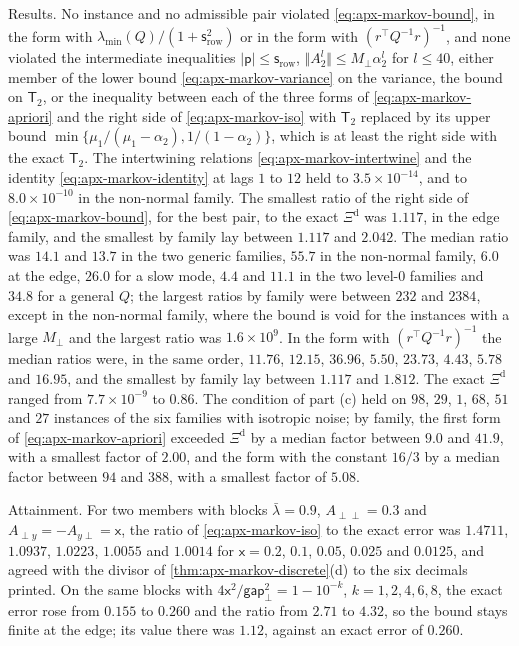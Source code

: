 \begin{numcheck}
Results. No instance and no admissible pair violated \eqref{eq:apx-markov-bound}, in the form with $\lambda_{\min}(Q)/(1+\mathsf s_{\mathrm{row}}^2)$ or in the form with $(r^\top Q^{-1}r)^{-1}$, and none violated the intermediate inequalities $\lvert\mathsf p\rvert\le\mathsf s_{\mathrm{row}}$, $\Vert A_2^l\Vert\le M_\perp\alpha_2^l$ for $l\le40$, either member of the lower bound \eqref{eq:apx-markov-variance} on the variance, the bound on $\mathsf T_2$, or the inequality between each of the three forms of \eqref{eq:apx-markov-apriori} and the right side of \eqref{eq:apx-markov-iso} with $\mathsf T_2$ replaced by its upper bound $\min\{\mu_1/(\mu_1-\alpha_2),1/(1-\alpha_2)\}$, which is at least the right side with the exact $\mathsf T_2$. The intertwining relations \eqref{eq:apx-markov-intertwine} and the identity \eqref{eq:apx-markov-identity} at lags $1$ to $12$ held to $3.5\times10^{-14}$, and to $8.0\times10^{-10}$ in the non-normal family. The smallest ratio of the right side of \eqref{eq:apx-markov-bound}, for the best pair, to the exact $\Xi^{\mathrm d}$ was $1.117$, in the edge family, and the smallest by family lay between $1.117$ and $2.042$. The median ratio was $14.1$ and $13.7$ in the two generic families, $55.7$ in the non-normal family, $6.0$ at the edge, $26.0$ for a slow mode, $4.4$ and $11.1$ in the two level-0 families and $34.8$ for a general $Q$; the largest ratios by family were between $232$ and $2384$, except in the non-normal family, where the bound is void for the instances with a large $M_\perp$ and the largest ratio was $1.6\times10^9$. In the form with $(r^\top Q^{-1}r)^{-1}$ the median ratios were, in the same order, $11.76$, $12.15$, $36.96$, $5.50$, $23.73$, $4.43$, $5.78$ and $16.95$, and the smallest by family lay between $1.117$ and $1.812$. The exact $\Xi^{\mathrm d}$ ranged from $7.7\times10^{-9}$ to $0.86$. The condition of part (c) held on $98$, $29$, $1$, $68$, $51$ and $27$ instances of the six families with isotropic noise; by family, the first form of \eqref{eq:apx-markov-apriori} exceeded $\Xi^{\mathrm d}$ by a median factor between $9.0$ and $41.9$, with a smallest factor of $2.00$, and the form with the constant $16/3$ by a median factor between $94$ and $388$, with a smallest factor of $5.08$.

Attainment. For two members with blocks $\bar\lambda=0.9$, $A_{\perp\perp}=0.3$ and $A_{\perp y}=-A_{y\perp}=\mathsf x$, the ratio of \eqref{eq:apx-markov-iso} to the exact error was $1.4711$, $1.0937$, $1.0223$, $1.0055$ and $1.0014$ for $\mathsf x=0.2$, $0.1$, $0.05$, $0.025$ and $0.0125$, and agreed with the divisor of \cref{thm:apx-markov-discrete}(d) to the six decimals printed. On the same blocks with $4\mathsf x^2/\mathsf{gap}_\perp^2=1-10^{-k}$, $k=1,2,4,6,8$, the exact error rose from $0.155$ to $0.260$ and the ratio from $2.71$ to $4.32$, so the bound stays finite at the edge; its value there was $1.12$, against an exact error of $0.260$.


\end{numcheck}
